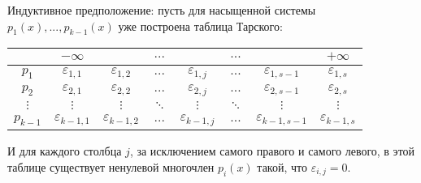 Индуктивное предположение: пусть для насыщенной системы $p_1(x), ... , p_{k-1}(x)$ уже построена таблица Тарского:
\begin{center}
    \begin{tabular}{ |c|c|c|c|c|c|c|c| } 
    \hline
                 & $-\infty$ &  & $...$ &  & $...$ &  & $+\infty$ \\ 
    \hline
        $p_1$ & $\varepsilon_{1, 1}$ & $\varepsilon_{1, 2}$ & $...$ & $\varepsilon_{1, j}$ & $...$ & $\varepsilon_{1, s-1}$ & $\varepsilon_{1, s}$ \\ 
    \hline
        $p_2$ & $\varepsilon_{2, 1}$ & $\varepsilon_{2, 2}$ & $...$ & $\varepsilon_{2, j}$ & $...$ & $\varepsilon_{2, s-1}$ & $\varepsilon_{2, s}$ \\ 
    \hline
        $\vdots$ & $\vdots$ & $\vdots$ & $\ddots$ & $\vdots$ & $\ddots$ & $\vdots$ & $\vdots$ \\
    \hline
        $p_{k-1}$ & $\varepsilon_{k-1, 1}$ & $\varepsilon_{k-1, 2}$ & $...$ & $\varepsilon_{k-1, j}$ & $...$ & $\varepsilon_{k-1, s-1}$ & $\varepsilon_{k-1, s}$\\    
    \hline
    \end{tabular}
\end{center}
И для каждого столбца $j$, за исключением самого правого и самого левого, в этой таблице существует ненулевой многочлен $p_i(x)$ такой, что $\varepsilon_{i, j} = 0$.

